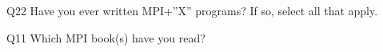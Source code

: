 \begin{description}%
\item{Q22} Have you ever written MPI+”X” programs? If so, select all that apply.%
\item{Q11} Which MPI book(s) have you read?%
\end{description}%
